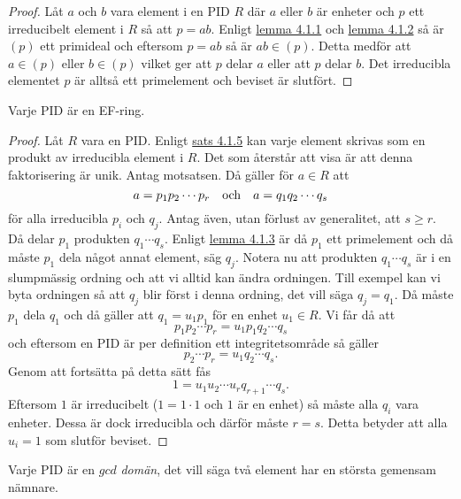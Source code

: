 \documentclass{article}
\theoremstyle{definition}
\begin{document}
\begin{proof}
  Låt $a$ och $b$ vara element i en PID $R$ där $a$ eller $b$ är enheter och $p$ ett irreducibelt element i $R$ så att $p = ab$. Enligt 
  \hyperlink{max}{lemma 4.1.1} och \hyperlink{maxprim}{lemma 4.1.2} så är $(p)$ ett primideal och eftersom $p = ab$ så är $ab \in (p)$.
  Detta medför att $a \in (p)$ eller $b \in (p)$ vilket ger att $p$ delar $a$ eller att $p$ delar $b$. Det irreducibla elementet $p$
  är alltså ett primelement och beviset är slutfört.
\end{proof}

\begin{mytheo}{}{}
  Varje PID är en EF-ring.
\end{mytheo} 

\begin{proof}
  Låt $R$ vara en PID. Enligt \hyperlink{inv}{sats 4.1.5} kan varje element skrivas som en produkt av irreducibla element i $R$. Det som 
  återstår att visa är att denna faktorisering är unik. Antag motsatsen. Då gäller för $a \in R$ att 
  \[ a = p_1p_2 \cdots p_r \quad \textnormal{och} \quad a = q_1q_2 \cdots q_s\]
  för alla irreducibla $p_i$ och $q_j.$ Antag även, utan förlust av generalitet, att $s \geq r.$ Då delar $p_1$ produkten $q_1 \cdots q_s.$
  Enligt \hyperlink{irprim}{lemma 4.1.3} är då $p_1$ ett primelement och då måste $p_1$ dela något annat element, säg $q_j.$
  Notera nu att produkten $q_1 \cdots q_s$ är i en slumpmässig ordning och att vi alltid kan ändra ordningen. Till exempel kan vi byta ordningen 
  så att $q_j$ blir först i denna ordning, det vill säga $q_j = q_1$. 
  Då måste $p_1$ dela $q_1$ och då gäller att $q_1 = u_1p_1$ för en enhet $u_1 \in R.$ Vi får då att 
  \[ p_1p_2 \cdots p_r = u_1p_1q_2 \cdots q_s \]
  och eftersom en PID är per definition ett integritetsområde så gäller 
  \[ p_2 \cdots p_r = u_1 q_2 \cdots q_s. \]
  Genom att fortsätta på detta sätt fås
  \[ 1 = u_1u_2 \cdots u_r q_{r+1} \cdots q_s. \]
  Eftersom $1$ är irreducibelt ($1 = 1 \cdot 1$ och $1$ är en enhet) så måste alla $q_i$ vara enheter. Dessa är dock irreducibla och därför måste 
  $r = s.$ Detta betyder att alla $u_i = 1$ som slutför beviset.
\end{proof}

\begin{mytheo}{}{}
  Varje PID är en $gcd$ \textit{domän}, det vill säga två element har en största gemensam nämnare. 
\end{mytheo}
\end{document}
